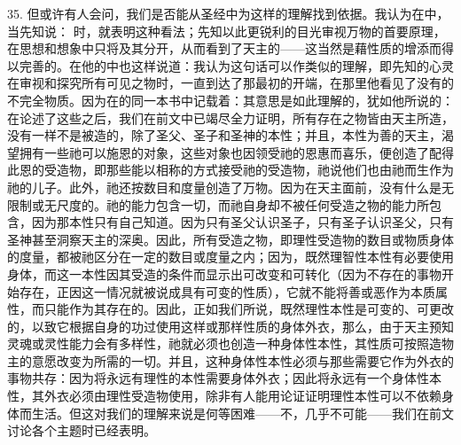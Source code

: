 35. 但或许有人会问，我们是否能从圣经中为这样的理解找到依据。我认为在中，当先知说： 时，就表明这种看法；先知以此更锐利的目光审视万物的首要原理，在思想和想象中只将及其分开，从而看到了天主的——这当然是藉性质的增添而得以完善的。在他的中也这样说道：我认为这句话可以作类似的理解，即先知的心灵在审视和探究所有可见之物时，一直到达了那最初的开端，在那里他看见了没有的不完全物质。因为在的同一本书中记载着：其意思是如此理解的，犹如他所说的：在论述了这些之后，我们在前文中已竭尽全力证明，所有存在之物皆由天主所造，没有一样不是被造的，除了圣父、圣子和圣神的本性；并且，本性为善的天主，渴望拥有一些祂可以施恩的对象，这些对象也因领受祂的恩惠而喜乐，便创造了配得此恩的受造物，即那些能以相称的方式接受祂的受造物，祂说他们也由祂而生作为祂的儿子。此外，祂还按数目和度量创造了万物。因为在天主面前，没有什么是无限制或无尺度的。祂的能力包含一切，而祂自身却不被任何受造之物的能力所包含，因为那本性只有自己知道。因为只有圣父认识圣子，只有圣子认识圣父，只有圣神甚至洞察天主的深奥。因此，所有受造之物，即理性受造物的数目或物质身体的度量，都被祂区分在一定的数目或度量之内；因为，既然理智性本性有必要使用身体，而这一本性因其受造的条件而显示出可改变和可转化（因为不存在的事物开始存在，正因这一情况就被说成具有可变的性质），它就不能将善或恶作为本质属性，而只能作为其存在的。因此，正如我们所说，既然理性本性是可变的、可更改的，以致它根据自身的功过使用这样或那样性质的身体外衣，那么，由于天主预知灵魂或灵性能力会有多样性，祂就必须也创造一种身体性本性，其性质可按照造物主的意愿改变为所需的一切。并且，这种身体性本性必须与那些需要它作为外衣的事物共存：因为将永远有理性的本性需要身体外衣；因此将永远有一个身体性本性，其外衣必须由理性受造物使用，除非有人能用论证证明理性本性可以不依赖身体而生活。但这对我们的理解来说是何等困难——不，几乎不可能——我们在前文讨论各个主题时已经表明。\par

